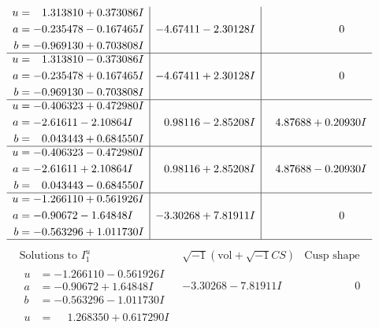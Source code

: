 \documentclass[1p]{elsarticle_modified}
\theoremstyle{definition}
\newcommand{\I}{\sqrt{-1}}
\begin{document}
$$\begin{array}{c|c|c}
\begin{aligned}
u &= \phantom{-}1.313810 + 0.373086 I \\
a &= -0.235478 - 0.167465 I \\
b &= -0.969130 + 0.703808 I\end{aligned}
 & -4.67411 - 2.30128 I & \phantom{-0.000000 } 0 \\ \hline\begin{aligned}
u &= \phantom{-}1.313810 - 0.373086 I \\
a &= -0.235478 + 0.167465 I \\
b &= -0.969130 - 0.703808 I\end{aligned}
 & -4.67411 + 2.30128 I & \phantom{-0.000000 } 0 \\ \hline\begin{aligned}
u &= -0.406323 + 0.472980 I \\
a &= -2.61611 - 2.10864 I \\
b &= \phantom{-}0.043443 + 0.684550 I\end{aligned}
 & \phantom{-}0.98116 - 2.85208 I & \phantom{-}4.87688 + 0.20930 I \\ \hline\begin{aligned}
u &= -0.406323 - 0.472980 I \\
a &= -2.61611 + 2.10864 I \\
b &= \phantom{-}0.043443 - 0.684550 I\end{aligned}
 & \phantom{-}0.98116 + 2.85208 I & \phantom{-}4.87688 - 0.20930 I \\ \hline\begin{aligned}
u &= -1.266110 + 0.561926 I \\
a &= -0.90672 - 1.64848 I \\
b &= -0.563296 + 1.011730 I\end{aligned}
 & -3.30268 + 7.81911 I & \phantom{-0.000000 } 0\\
 \hline 
 \end{array}$$\newpage$$\begin{array}{c|c|c}  
\text{Solutions to }I^u_{1}& \I (\text{vol} + \sqrt{-1}CS) & \text{Cusp shape}\\
 \hline 
\begin{aligned}
u &= -1.266110 - 0.561926 I \\
a &= -0.90672 + 1.64848 I \\
b &= -0.563296 - 1.011730 I\end{aligned}
 & -3.30268 - 7.81911 I & \phantom{-0.000000 } 0 \\ \hline\begin{aligned}
u &= \phantom{-}1.268350 + 0.617290 I \\

\end{aligned}
\end{array}$$
\end{document}
